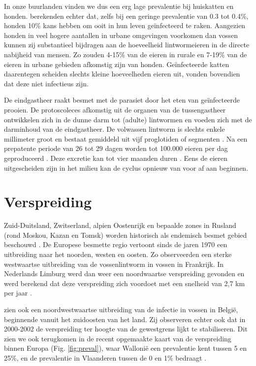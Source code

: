 \documentclass[twoside]{extreport}
\begin{document}
In onze buurlanden vinden we dus een erg lage prevalentie bij huiskatten
en honden. \citet{hegglin2013control} berekenden echter dat, zelfs bij
een geringe prevalentie van 0.3 tot 0.4\%, honden 10\% kans hebben om
ooit in hun leven geïnfecteerd te raken. Aangezien honden in veel hogere
aantallen in urbane omgevingen voorkomen dan vossen kunnen zij
substantieel bijdragen aan de hoeveelheid lintwormeieren in de directe
nabijheid van mensen. Zo zouden 4-15\% van de eieren in rurale en 7-19\%
van de eieren in urbane gebieden afkomstig zijn van honden.
Geïnfecteerde katten daarentegen scheiden slechts kleine hoeveelheden
eieren uit, \citet{kapel2006reproductive} vonden bovendien dat deze niet
infectieus zijn.

De eindgastheer raakt besmet met de parasiet door het eten van
geïnfecteerde prooien. De protoscoleces afkomstig uit de organen van de
tussengastheer ontwikkelen zich in de dunne darm tot (adulte) lintwormen
en voeden zich met de darminhoud van de eindgastheer. De volwassen
lintworm is slechts enkele millimeter groot en bestaat gemiddeld uit
vijf proglotiden of segmenten \citep{eckert2004biological}. Na een
prepatente periode van 26 tot 29 dagen worden tot 100.000 eieren per dag
geproduceerd \citep{kapel2006reproductive}. Deze excretie kan tot vier
maanden duren \citep{eckert2001oie}. Eens de eieren uitgescheiden zijn
in het milieu kan de cyclus opnieuw van voor af aan beginnen.

\newpage

\section{Verspreiding}\label{verspreiding}

Zuid-Duitsland, Zwitserland, alpien Oostenrijk en bepaalde zones in
Rusland (rond Moskou, Kazan en Tomsk) worden historisch als endemisch
besmet gebied beschouwd \citep{eckert2017historical}. De Europese
besmette regio vertoont sinds de jaren 1970 een uitbreiding naar het
noorden, westen en oosten. Zo observeerden \citet{combes2012westward}
een sterke westwaartse uitbreiding van de vossenlintworm in vossen in
Frankrijk. In Nederlands Limburg werd dan weer een noordwaartse
verspreiding gevonden en werd berekend dat deze verspreiding zich
voordoet met een snelheid van 2,7 km per jaar
\citep{takumi2008evidence}.

\citet{vervaeke2006spatial} zien ook een noordwestwaartse uitbreiding
van de infectie in vossen in België, beginnende vanuit het zuidoosten
van het land. Zij observeren echter ook dat in 2000-2002 de verspreiding
ter hoogte van de gewestgrens lijkt te stabiliseren. Dit zien we ook
terugkomen in de recent opgemaakte kaart van de verspreiding binnen
Europa (Fig. \ref{fig:preval}), waar Wallonië een prevalentie kent
tussen 5 en 25\%, en de prevalentie in Vlaanderen tussen de 0 en 1\%
bedraagt \citep{eckert2017historical}.
\end{document}
